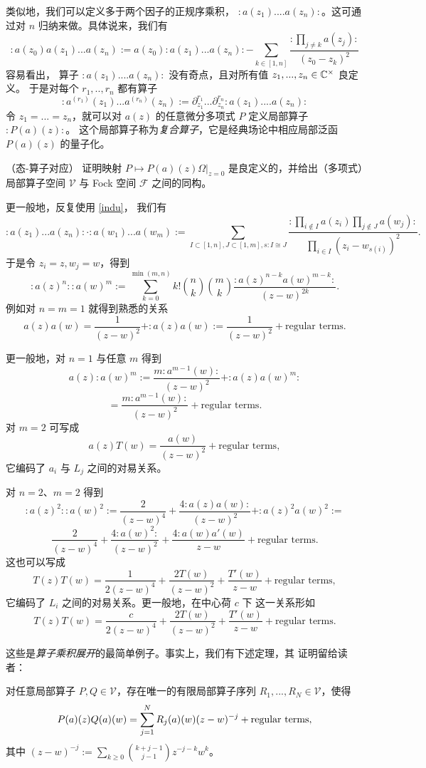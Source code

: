 类似地，我们可以定义多于两个因子的正规序乘积，
$:a(z_1)....a(z_n):$。这可通过对 $n$ 归纳来做。具体说来，我们有
\begin{equation}\label{indu}
:a(z_0)a(z_1)...a(z_n):=a(z_0):a(z_1)...a(z_n):-\sum_{k\in [1,n]}\frac{:\prod_{j\ne k}a(z_j):}{(z_0-z_k)^2}
\end{equation}
容易看出，
算子 $:a(z_1)....a(z_n):$ 没有奇点，且对所有值 $z_1,...,z_n\in \Bbb C^\times$ 良定义。
于是对每个 $r_1,..,r_n$ 都有算子
$$
:a^{(r_1)}(z_1)...a^{(r_n)}(z_n):=\partial_{z_1}^{r_1}...\partial_{z_n}^{r_n}:a(z_1)....a(z_n):
$$
令 $z_1=...=z_n$，就可以对 $a(z)$ 的任意微分多项式 $P$ 定义局部算子 $:P(a)(z):$。
这个局部算子称为\emph{复合算子}，它是经典场论中相应局部泛函 $P(a)(z)$ 的量子化。

\begin{exercise} （态-算子对应）
证明映射 $P\mapsto P(a)(z)\Omega|_{z=0}$
是良定义的，并给出（多项式）局部算子空间
$\mathcal V$ 与 Fock 空间 $\mathcal F$ 之间的同构。
\end{exercise} 

更一般地，反复使用 \eqref{indu}，
我们有
\scriptsize
$$
:a(z_1)...a(z_n):\cdot :a(w_1)...a(w_m):=
\sum_{I\subset [1,n], J\subset [1,m], s: I\cong J}
\frac{:\prod_{i\notin I}a(z_i)\prod_{j\notin J}a(w_j):}{\prod_{i\in I}(z_i-w_{s(i)})^2}.
$$
\normalsize 于是令 $z_i=z,w_j=w$，得到
$$
:a(z)^n::a(w)^m:=\sum_{k=0}^{\min(m,n)}k!\binom{n}{k}\binom{m}{k}\frac{:a(z)^{n-k}a(w)^{m-k}:}{(z-w)^{2k}}.
$$
例如对 $n=m=1$ 就得到熟悉的关系
$$
a(z)a(w)=\frac{1}{(z-w)^2}+:a(z)a(w):=\frac{1}{(z-w)^2}+\text{regular terms}.
$$

更一般地，对 $n=1$ 与任意 $m$ 得到
$$
a(z):a(w)^m:=\frac{m:a^{m-1}(w):}{(z-w)^2}+:a(z)a(w)^m:
$$
$$
=\frac{m:a^{m-1}(w):}{(z-w)^2}+\text{regular terms}.
$$
对 $m=2$ 可写成
$$
a(z)T(w)=\frac{a(w)}{(z-w)^2}+\text{regular terms},
$$
它编码了 $a_i$ 与 $L_j$ 之间的对易关系。

对 $n=2$、$m=2$ 得到
$$
:a(z)^2::a(w)^2:=\frac{2}{(z-w)^4}+\frac{4:a(z)a(w):}{(z-w)^2}+:a(z)^2a(w)^2:=
$$
$$
\frac{2}{(z-w)^4}+\frac{4:a(w)^2:}{(z-w)^2}+
\frac{4:a(w)a'(w)}{z-w}+\text{regular terms}.
$$
这也可以写成
$$
T(z)T(w)=\frac{1}{2(z-w)^4}+\frac{2T(w)}{(z-w)^2}+\frac{T'(w)}{z-w}+\text{regular terms},
$$ 
它编码了 $L_i$ 之间的对易关系。更一般地，在中心荷 $c$ 下
这一关系形如
$$
T(z)T(w)=\frac{c}{2(z-w)^4}+\frac{2T(w)}{(z-w)^2}+\frac{T'(w)}{z-w}+\text{regular terms}.
$$ 

这些是\emph{算子乘积展开}的最简单例子。事实上，我们有下述定理，其
证明留给读者：

\begin{theorem}\label{opethm}
对任意局部算子 $P,Q\in \mathcal V$，存在唯一的有限局部算子序列
$R_{1},...,R_{N}\in \mathcal V$，使得
$$
P(a)(z)Q(a)(w)=\sum_{j=1}^{N}R_j(a)(w)(z-w)^{-j}+\text{\rm regular terms},
$$
其中 $(z-w)^{-j}:=\sum_{k\ge 0} \binom{k+j-1}{j-1}z^{-j-k}w^k$。
\end{theorem} 

